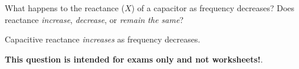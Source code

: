

What happens to the reactance ($X$) of a capacitor as frequency decreases?  Does reactance {\it increase}, {\it decrease}, or {\it remain the same}?







Capacitive reactance {\it increases} as frequency decreases.







{\bf This question is intended for exams only and not worksheets!}.




